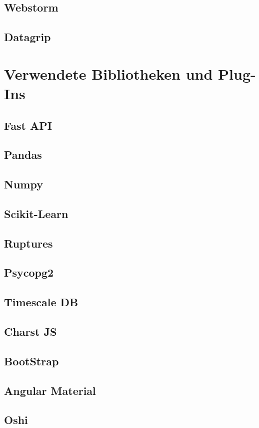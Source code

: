 \documentclass[pdftex,11pt,a4paper,oneside]{book}
\begin{document}
\subsection{Webstorm}
\subsection{Datagrip}
\section{Verwendete Bibliotheken und Plug-Ins}
\subsection{Fast API}
\subsection{Pandas}
\subsection{Numpy}
\subsection{Scikit-Learn}
\subsection{Ruptures}
\subsection{Psycopg2}
\subsection{Timescale DB}
\subsection{Charst JS}
\subsection{BootStrap}
\subsection{Angular Material}
\subsection{Oshi}
\end{document}
